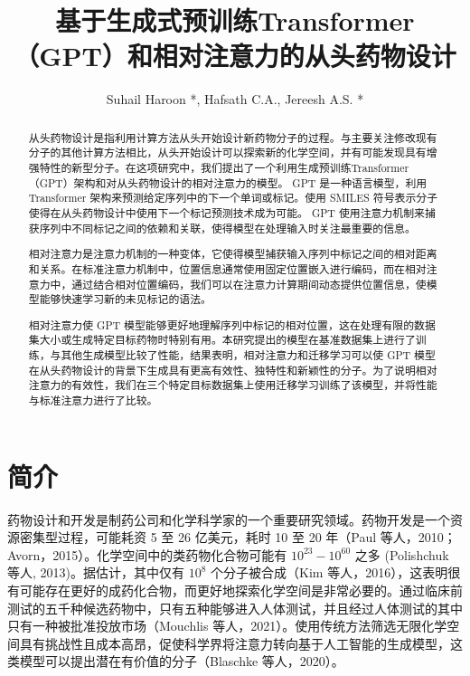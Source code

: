 \begin{translation}
\label{cha:translation}

\title{基于生成式预训练Transformer（GPT）和相对注意力的从头药物设计}
\maketitle

\tableofcontents
\author{Suhail Haroon *, Hafsath C.A., Jereesh A.S. *}

\begin{abstract}

  从头药物设计是指利用计算方法从头开始设计新药物分子的过程。与主要关注修改现有分子的其他计算方法相比，从头开始设计可以探索新的化学空间，并有可能发现具有增强特性的新型分子。在这项研究中，我们提出了一个利用生成预训练Transformer（GPT）架构和对从头药物设计的相对注意力的模型。 GPT 是一种语言模型，利用 Transformer 架构来预测给定序列中的下一个单词或标记。使用 SMILES 符号表示分子使得在从头药物设计中使用下一个标记预测技术成为可能。 GPT 使用注意力机制来捕获序列中不同标记之间的依赖和关联，使得模型在处理输入时关注最重要的信息。

  相对注意力是注意力机制的一种变体，它使得模型捕获输入序列中标记之间的相对距离和关系。在标准注意力机制中，位置信息通常使用固定位置嵌入进行编码，而在相对注意力中，通过结合相对位置编码，我们可以在注意力计算期间动态提供位置信息，使模型能够快速学习新的未见标记的语法。

  相对注意力使 GPT 模型能够更好地理解序列中标记的相对位置，这在处理有限的数据集大小或生成特定目标药物时特别有用。本研究提出的模型在基准数据集上进行了训练，与其他生成模型比较了性能，结果表明，相对注意力和迁移学习可以使 GPT 模型在从头药物设计的背景下生成具有更高有效性、独特性和新颖性的分子。为了说明相对注意力的有效性，我们在三个特定目标数据集上使用迁移学习训练了该模型，并将性能与标准注意力进行了比较。
\end{abstract}


\section{简介}

药物设计和开发是制药公司和化学科学家的一个重要研究领域。药物开发是一个资源密集型过程，可能耗资 5 至 26 亿美元，耗时 10 至 20 年（Paul 等人，2010；Avorn，2015）\citep{Avorn_2015}。化学空间中的类药物化合物可能有 $10^{23}-10^{60}$ 之多 (Polishchuk 等人, 2013)。据估计，其中仅有 $10^8$ 个分子被合成（Kim 等人，2016），这表明很有可能存在更好的成药化合物，而更好地探索化学空间是非常必要的。通过临床前测试的五千种候选药物中，只有五种能够进入人体测试，并且经过人体测试的其中只有一种被批准投放市场（Mouchlis 等人，2021）。使用传统方法筛选无限化学空间具有挑战性且成本高昂，促使科学界将注意力转向基于人工智能的生成模型，这类模型可以提出潜在有价值的分子（Blaschke 等人，2020）。


\end{translation}
